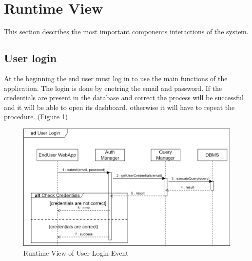 \section{Runtime View}
This section describes the most important components interactions of the system.

\subsection{User login}
At the beginning the end user must log in to use the main functions of the application. The login is done by enetring the email and password. If the credentials are present in the database and correct the process will be successful and it will be able to open its dashboard, otherwise it will have to repeat the procedure. (Figure \ref{fig:RuntimeView_UserLogin})
\begin{figure}[H]
    \centering
    \includegraphics[width=\textwidth]{images/runtimeviews/RuntimeView_UserLogin.png}
    \caption{Runtime View of User Login Event}
    \label{fig:RuntimeView_UserLogin}
\end{figure}

